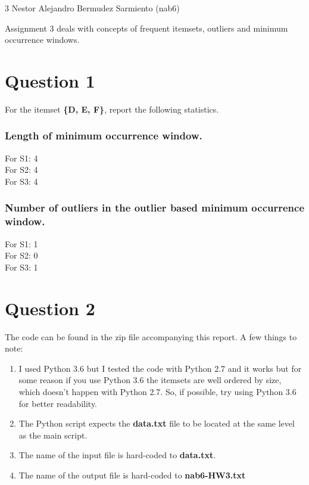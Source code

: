 \documentclass[11pt]{article}
\begin{document}
\homework
    {3}
    {Nestor Alejandro Bermudez Sarmiento (nab6)}
    {}

Assignment 3 deals with concepts of  frequent itemsets, outliers and minimum occurrence windows. 

\section*{Question 1}
For the itemset \textbf{\{D, E, F\}}, report the following statistics.

\subsubsection*{Length of minimum occurrence window.}
For S1: 4\\
For S2: 4\\
For S3: 4

\subsubsection*{Number of outliers in the outlier based minimum occurrence window.}
For S1: 1\\
For S2: 0\\
For S3: 1

\section*{Question 2}
The code can be found in the zip file accompanying this report. A few things to note:

\begin{enumerate}
\item I used Python 3.6 but I tested the code with Python 2.7 and it works but for some reason if you use Python 3.6 the itemsets are well ordered by size, which doesn't happen with Python 2.7. So, if possible, try using Python 3.6 for better readability.
\item The Python script expects the \textbf{data.txt} file to be located at the same level as the main script.
\item The name of the input file is hard-coded to \textbf{data.txt}.
\item The name of the output file is hard-coded to \textbf{nab6-HW3.txt}
\end{enumerate}
\end{document}
